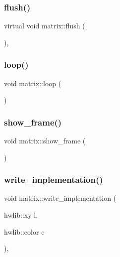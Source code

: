 \mbox{\label{classmatrix_a867830c5b26171d0b031aadeb8ad1eee}} 
\subsubsection{\texorpdfstring{flush()}{flush()}}
{\footnotesize\ttfamily virtual void matrix\+::flush (\begin{DoxyParamCaption}{ }\end{DoxyParamCaption})\hspace{0.3cm}{\ttfamily [inline]}, {\ttfamily [virtual]}}

\mbox{\label{classmatrix_a6d2edd1ca96668aed4dfa402fb558d8c}} 
\subsubsection{\texorpdfstring{loop()}{loop()}}
{\footnotesize\ttfamily void matrix\+::loop (\begin{DoxyParamCaption}{ }\end{DoxyParamCaption})}

\mbox{\label{classmatrix_a2d1d88257855bff38c7359e183e26e43}} 
\subsubsection{\texorpdfstring{show\+\_\+frame()}{show\_frame()}}
{\footnotesize\ttfamily void matrix\+::show\+\_\+frame (\begin{DoxyParamCaption}{ }\end{DoxyParamCaption})}

\mbox{\label{classmatrix_a81034d9b2d1b26438be9861e837a962b}} 
\subsubsection{\texorpdfstring{write\+\_\+implementation()}{write\_implementation()}}
{\footnotesize\ttfamily void matrix\+::write\+\_\+implementation (\begin{DoxyParamCaption}\item[{hwlib\+::xy}]{l,  }\item[{hwlib\+::color}]{c }\end{DoxyParamCaption})\hspace{0.3cm}{\ttfamily [private]}, {\ttfamily [virtual]}}



